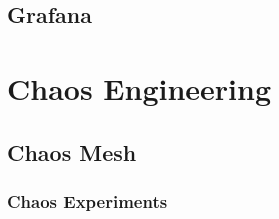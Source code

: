 \subsection{Grafana}


\section{Chaos Engineering}

\subsection{Chaos Mesh}

\subsubsection{Chaos Experiments}



